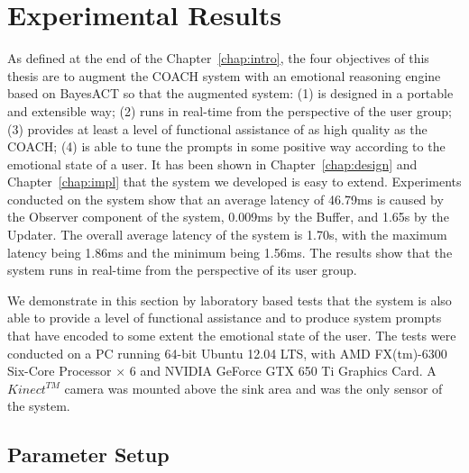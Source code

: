 \chapter{Experimental Results}
\label{chap:result}

As defined at the end of the Chapter~\ref{chap:intro}, the four objectives of this thesis are to augment the COACH system with an emotional reasoning engine based on BayesACT so that the augmented system: (1) is designed in a portable and extensible way; (2) runs in real-time from the perspective of the user group; (3) provides at least a level of functional assistance of as high quality as the COACH; (4) is able to tune the prompts in some positive way according to the emotional state of a user. It has been shown in Chapter~\ref{chap:design} and Chapter~\ref{chap:impl} that the system we developed is easy to extend. Experiments conducted on the system show that an average latency of 46.79ms is caused by the Observer component of the system, 0.009ms by the Buffer, and 1.65s by the Updater. The overall average latency of the system is 1.70s, with the maximum latency being 1.86ms and the minimum being 1.56ms. The results show that the system runs in real-time from the perspective of its user group. 

We demonstrate in this section by laboratory based tests that the system is also able to provide a level of functional assistance and to produce system prompts that have encoded to some extent the emotional state of the user. The tests were conducted on a PC running 64-bit Ubuntu 12.04 LTS, with AMD FX(tm)-6300 Six-Core Processor × 6 and NVIDIA GeForce GTX 650 Ti Graphics Card. A $Kinect^{TM}$ camera was mounted above the sink area and was the only sensor of the system.

\section{Parameter Setup}

